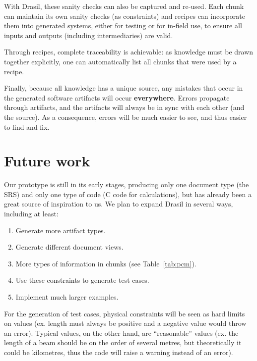 \documentclass{sig-alternate-05-2015}
\newcommand{\lss}{Drasil}
\begin{document}
With \lss, these sanity checks can also be captured and re-used.  Each chunk
can maintain its own sanity checks (as constraints) and recipes can incorporate
them into generated systems, either for testing or for in-field use, to ensure
all inputs and outputs (including intermediaries) are valid.

Through recipes, complete traceability is achievable: as knowledge must be
drawn together explicitly, one can automatically list all chunks that were
used by a recipe.

Finally, because all knowledge has a unique source, any mistakes that occur in
the generated software artifacts will occur \textbf{everywhere}. Errors
propagate through artifacts, and the artifacts will always be in sync with each
other (and the source). As a consequence, errors will be much easier to see,
and thus easier to find and fix.  

\section{Future work} \label{sec:todo}

Our prototype is still in its early stages, producing only one document type
(the SRS) and only one type of code (C code for calculations), but has 
already been a great source of inspiration to us. We plan to expand
\lss{} in several ways, including at least:
\begin{enumerate}
\setlength{\itemsep}{0pt}
\setlength{\parskip}{0pt}
\setlength{\parsep}{0pt}
\item Generate more artifact types. %
\item Generate different document views. %
\item More types of information in chunks (see Table~\ref{tab:pcm}).
\item Use these constraints to generate test cases.
\item Implement much larger examples.
\end{enumerate}

For the generation of test cases, physical constraints will be seen as hard
limits on values (ex. length must always be positive and a negative value would
throw an error). Typical values, on the other hand, are ``reasonable'' values
(ex. the length of a beam should be on the order of several metres, but
theoretically it could be kilometres, thus the code will raise a warning
instead of an error).
\end{document}

